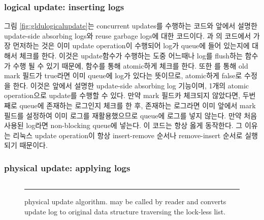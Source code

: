 \subsubsection{logical update: inserting logs}
\ifkor

그림 \ref{fig:gldulogicalupdate}는 concurrent updates를 수행하는 코드와 앞에서 설명한 update-side
absorbing logs와 reuse garbage logs에 대한 코드이다. 과
의 코드에서 가장 먼저하는 것은 이미 update operation이 수행되어 log가 queue에 들어
있는지에 대해서 체크를 한다. 이것은 update함수가 수행하는 도중 어느때나 log를 flush하는  함수가
수행 될 수 있기 때문에,  함수를 통해 atomic하게 체크를 한다. 또한 를 통해 old mark
필드가 true라면 이미 queue에 log가 있다는 뜻이므로, atomic하게 false로 수정을 한다.
이것은 앞에서 설명한 update-side absorbing log 기능이며, 1개의 atomic operation으로 update를 수행할 수
있다.
만약 mark 필드카 체크되지 않았다면, 두번째로 queue에 존재하는 로그인지 체크를 한 후, 존재하는 로그라면
이미 앞에서 mark필드를 설정하여 이미 로그를 재활용했으므로 queue에 로그를 넣지 않는다.
만약 처음 사용된 log라면 non-blocking queue에 넣는다.
이 코드는 항상 옳게 동작한다.  
그 이유는 리눅스 update operation이 항상 insert-remove 순서나 remove-insert 순서로 실행되기 때문이다.
\else




\fi


\subsubsection{physical update: applying logs}


\begin{figure}[tb!]
\inputminted[linenos,fontsize=\footnotesize, tabsize=2]{c}{src/ldu_physical.c}
\rule{\columnwidth}{0.5pt}
\vspace{-\baselineskip}
\caption{ physical update algorithm.  may be
 called by reader and converts update log to original data structure
 traversing the lock-less list.}
\label{fig:glduphysicalupdate}
\end{figure}

